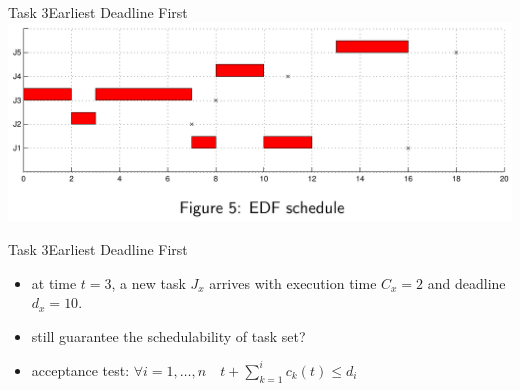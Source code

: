 \begin{frame}{Task 3}{Earliest Deadline First}
  \includegraphics[width=\textwidth]{./figures/3_sol.png}
\end{frame}

\begin{frame}{Task 3}{Earliest Deadline First}
  \begin{tasknoinc}
    \begin{itemize}
      \item at time $t = 3$, a new task $J_x$ arrives with execution time $C_x = 2$ and deadline $d_x = 10$.
      \item still \alert{guarantee the schedulability} of task set?
    \end{itemize}
  \end{tasknoinc}
  \begin{requirements}
    \begin{itemize}
      \item \alert{acceptance test:} $\forall i=1, \ldots, n \quad t+\sum_{k=1}^i c_k(t) \leq d_i$
    \end{itemize}
  \end{requirements}
\end{frame}


